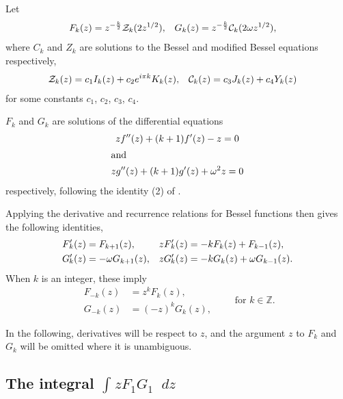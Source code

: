 \documentclass[parskip=half]{scrartcl}
\newcommand{\Int}[2]{\int_{#1}^{#2}\!}
\newcommand{\D}{\mathop{}\!d}
\theoremstyle{nonumberplain}
\begin{document}
\newcommand{\Fp}{\smash{F^{\mathrlap{\prime}}}\mkern-2.0mu}
\newcommand{\Gp}{\smash{G^{\mathrlap{\prime}}}\mkern-2.0mu}

Let
\begin{equation}
    \begin{aligned}
        F_k(z) &= z^{-\frac{k}{2}}\mathcal{Z}_k(2z^{1/2}),&
        G_k(z) &= z^{-\frac{k}{2}}\mathcal{C}_k(2\omega z^{1/2}),
    \end{aligned}
\end{equation}
where $C_k$ and $Z_k$ are solutions to the Bessel and modified Bessel equations
respectively,
\begin{equation}
    \begin{aligned}
        \mathcal{Z}_k(z) &= c_1 I_k(z) + c_2 e^{i\pi k} K_k(z),&
        \mathcal{C}_k(z) &= c_3 J_k(z) + c_4 Y_k(z)
    \end{aligned}
\end{equation}
for some constants $c_1$, $c_2$, $c_3$, $c_4$.

$F_k$ and $G_k$ are solutions of the differential equations
\begin{gather}
    z f''(z) + (k+1) f'(z) - z = 0\\
    \intertext{and}
    z g''(z) + (k+1) g'(z) + \omega^2 z = 0
\end{gather}
respectively, following the identity (2) of \autocite[p.~512]{lommel1879}.

Applying the derivative and recurrence relations for Bessel functions
\autocite[\S 10.6, \S10.29]{nistdlmf} then gives the following identities,
\begin{align}
    \label{eq:fgrel}
    \Fp_k(z) &= F_{k+1}(z), & z \Fp_k(z) &= -k F_k(z) + F_{k-1}(z),\\
    \Gp_k(z) &= -\omega G_{k+1}(z), & z \Gp_k(z) &= -k G_k(z) + \omega G_{k-1}(z).
\end{align}
When $k$ is an integer, these imply
\begin{equation}
    \begin{aligned}
        F_{-k}(z) &= z^k F_k(z),\\
        G_{-k}(z) &= (-z)^k G_k(z),
    \end{aligned}
    \qquad \text{for $k\in\mathbb{Z}$}.
\end{equation}

In the following, derivatives will be respect to $z$, and the argument $z$ to
$F_k$ and $G_k$ will be omitted where it is unambiguous.

\subsection*{The integral $\Int{}{} z F_1 G_1 \D z$}
\end{document}
